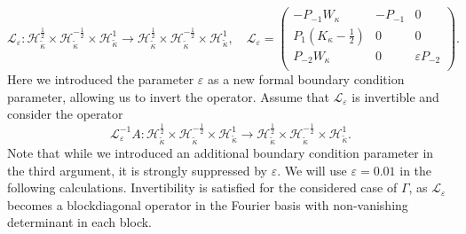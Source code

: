 \documentclass[12pt,journal,compsoc, onecolumn]{IEEEtran}
\begin{document}
\begin{equation} 
\label{eq:L_operator}
\mathcal{L}_\varepsilon: \mathcal{H}_{\tilde \kappa}^{\frac{1}{2}} \times \mathcal{H}_{\tilde \kappa}^{-\frac{1}{2}} \times \mathcal{H}_{\tilde \kappa}^{1} \rightarrow \mathcal{H}_{\tilde \kappa}^{\frac{1}{2}} \times \mathcal{H}_{\tilde \kappa}^{-\frac{1}{2}} \times \mathcal{H}_{\tilde \kappa}^{1}, \quad
\mathcal{L}_\varepsilon = 
        \begin{pmatrix}
             -P_{-1}W_{\kappa}& -P_{-1} &  0\\
             P_{1}(K_{\kappa} - \frac{1}{2}) & 0 & 0 \\
             P_{-2}W_{\kappa} & 0& \varepsilon P_{-2}  \\
        \end{pmatrix}.
\end{equation}
Here we introduced the parameter $\varepsilon$ as a new formal boundary condition parameter, allowing us to invert the operator.
Assume that $\mathcal{L}_\varepsilon$ is invertible and consider the operator $$\mathcal{L}_\varepsilon^{-1}A:  \mathcal{H}_{\tilde \kappa}^{\frac{1}{2}} \times \mathcal{H}_{\tilde \kappa}^{-\frac{1}{2}} \times \mathcal{H}_{\tilde \kappa}^{1} \rightarrow  \mathcal{H}_{\tilde \kappa}^{\frac{1}{2}} \times \mathcal{H}_{\tilde \kappa}^{-\frac{1}{2}} \times \mathcal{H}_{\tilde \kappa}^{1}.$$ Note that while we introduced an additional boundary condition parameter in the third argument, it is strongly suppressed by $\varepsilon$. We will use $\varepsilon = 0.01$ in the following calculations. 
Invertibility is satisfied for the considered case of $\Gamma$, as $\mathcal{L}_\varepsilon$ becomes a blockdiagonal operator in the Fourier basis with non-vanishing determinant in each block. 
\end{document}
